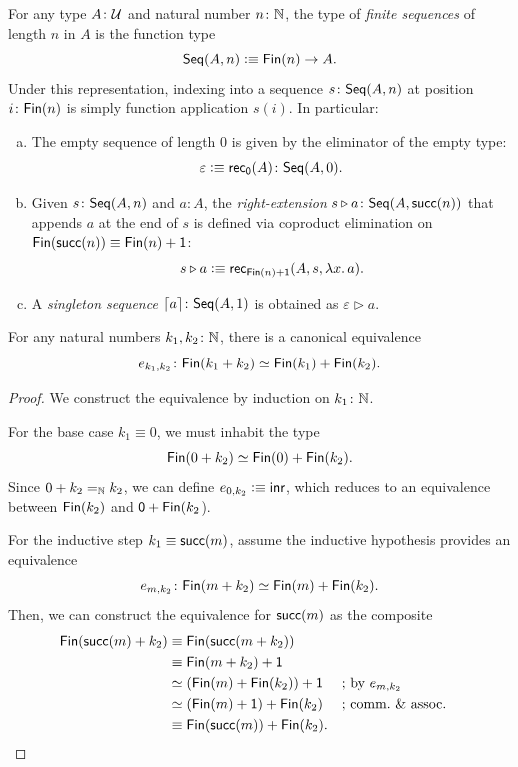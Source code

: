 \begin{defn}\label{defn:finite-seq}
    For any type $A\colon\univ$ and natural number $n\colon\N$, the type of \textsl{finite sequences} of length $n$ in $A$ is the function type
    \[
        \mathsf{Seq}(A,n)\mathrel{\vcentcolon}\equiv\mathsf{Fin}(n)\to A.
    \]
    Under this representation, indexing into a sequence $s\colon\fun{Seq}(A,n)$ at position $i\colon\fun{Fin}(n)$ is simply function application $s(i)$. In particular:
    \begin{enumerate}[a),font=\upshape]
        \item The empty sequence of length $0$ is given by the eliminator of the empty type:
        \[
            \varepsilon\defeq\fun{rec}_{\fun0}(A)\colon\fun{Seq}(A,0).
        \]
        \item Given $s\colon\fun{Seq}(A,n)$ and $a\colon A$, the \textsl{right-extension} $s\rwct a\colon\fun{Seq}(A,\fun{succ}(n))$ that appends $a$ at the end of $s$ is defined via coproduct elimination on $\mathsf{Fin}(\mathsf{succ}(n))\equiv\mathsf{Fin}(n)+\mathsf{1}$:
        \[
            s\triangleright a\mathrel{\vcentcolon}\equiv\mathsf{rec}_{\mathsf{Fin}(n)+\mathsf{1}}(A,s,\lambda x.\,a).
        \]
        \item A \textsl{singleton sequence} $\formseq{a}\colon\fun{Seq}(A,1)$ is obtained as $\varepsilon\triangleright a$.
    \end{enumerate}
\end{defn}

\begin{lem}
    For any natural numbers\/ $k_1,k_2\colon\N$, there is a canonical equivalence
    \[
        e_{k_1,k_2}\colon\fun{Fin}(k_1+k_2)
            \simeq\fun{Fin}(k_1)+\fun{Fin}(k_2).
    \]
\end{lem}

\begin{proof}
    We construct the equivalence by induction on $k_1\colon\N$.
    
    For the base case $k_1\equiv0$, we must inhabit the type
    \[
        \mathsf{Fin}(0+k_2)\simeq\mathsf{Fin}(0)+\mathsf{Fin}(k_2).
    \]
    Since $0+k_2\mathrel{=_{\mathbb{N}}} k_2$, we can define $e_{0,k_2}\mathrel{\vcentcolon}\equiv\mathsf{inr}$, which reduces to an equivalence between $\mathsf{Fin}(k_2)$ and $\mathsf{0}+\mathsf{Fin}(k_2$).

    For the inductive step $k_1\equiv\mathsf{succ}(m)$, assume the inductive hypothesis provides an equivalence
    \[
        e_{m,k_2}\colon\fun{Fin}(m+k_2)
            \simeq\fun{Fin}(m)+\fun{Fin}(k_2).
    \]
    Then, we can construct the equivalence for $\mathsf{succ}(m)$ as the composite
    \begin{align*}
        \mathsf{Fin}(\mathsf{succ}(m)+k_2)
            &\equiv\mathsf{Fin}(\mathsf{succ}(m+k_2))\\
            &\equiv\mathsf{Fin}(m+k_2)+\mathsf{1}\\
            &\simeq(\mathsf{Fin}(m)+\mathsf{Fin}(k_2))+\mathsf{1}
                &&\text{; by }e_{m,k_2}\\
            &\simeq(\mathsf{Fin}(m)+\mathsf{1})+\mathsf{Fin}(k_2)
                &&\text{; comm.~\& assoc.}\\
            &\equiv\mathsf{Fin}(\mathsf{succ}(m))+\mathsf{Fin}(k_2).
    \end{align*}
\end{proof}

